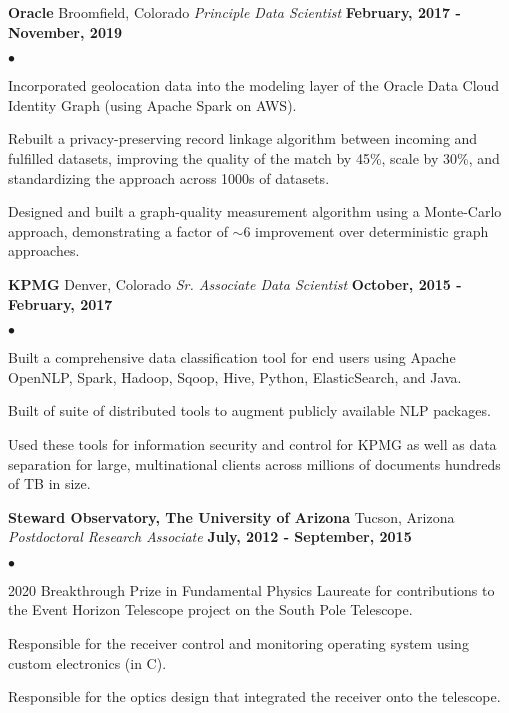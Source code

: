 \documentclass[margin,line, 11pt]{res}
\newenvironment{list2}{
  \begin{list}{$\bullet$}{%
      \setlength{\itemsep}{0in}
      \setlength{\parsep}{0in} \setlength{\parskip}{0in}
      \setlength{\topsep}{0in} \setlength{\partopsep}{0in}
      \setlength{\leftmargin}{0.2in}}}{\end{list}}
\begin{document}
\begin{resume}
\textbf{Oracle} \hfill Broomfield, Colorado\newline
\textit{Principle Data Scientist} \hfill \textbf{February, 2017 - November, 2019}\newline
    \begin{list2}
    	\vspace*{-5mm}
      \item Incorporated geolocation data into the modeling layer of the Oracle Data Cloud Identity Graph (using Apache Spark on AWS).
    	\item Rebuilt a privacy-preserving record linkage algorithm between incoming and fulfilled datasets, improving the quality of the match by 45\%, scale by 30\%, and standardizing the approach across 1000s of datasets.
    	\item Designed and built a graph-quality measurement algorithm using a Monte-Carlo approach, demonstrating a factor of $\sim 6$ improvement over deterministic graph approaches.
    \end{list2}
\vspace*{-2mm}

\textbf{KPMG} \hfill Denver, Colorado\newline
\textit{Sr. Associate Data Scientist} \hfill \textbf{October, 2015 - February, 2017}\newline
    \begin{list2}
    	\vspace*{-5mm}
      \item Built a comprehensive data classification tool for end users using Apache OpenNLP, Spark, Hadoop, Sqoop, Hive, Python, ElasticSearch, and Java.
      \item Built of suite of distributed tools to augment publicly available NLP packages.
      \item Used these tools for information security and control for KPMG as well as data separation for large, multinational clients across millions of documents hundreds of TB in size.
\vspace*{-2mm}

\textbf{Steward Observatory, The University of Arizona} \hfill Tucson, Arizona\newline
\textit{Postdoctoral Research Associate} \hfill \textbf{July, 2012 - September, 2015}\newline
    \begin{list2}
    	\vspace*{-5mm}
      \item 2020 Breakthrough Prize in Fundamental Physics Laureate for contributions to the Event Horizon Telescope project on the South Pole Telescope.
      \item Responsible for the receiver control and monitoring operating system using custom electronics (in C).
      \item Responsible for the optics design that integrated the receiver onto the telescope.
    \end{list2}
\vspace*{-2mm}


\end{list2}
\end{resume}
\end{document}
